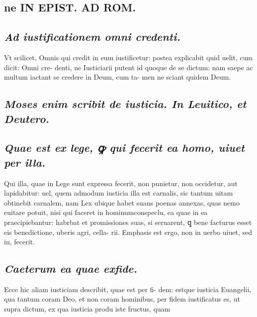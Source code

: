 \documentclass{article}
\begin{document}
\begin{pages}
\section*{ne IN EPIST. AD ROM.  }
\marginpar{[ p.]}
{}
\subsection*{\textit{Ad iustificationem omni credenti. }}\pstart Vt scilicet, Omnis qui credit in eum iustificetur: postea explicabit quid uelit, cum dicit: Omni cre- denti, ne Iusticiarii putent id quoque de se dictum: nam saepe ac multum iactant se credere in Deum, cum ta- men ne sciant quidem Deum.  \pend
{}
{}
\subsection*{\textit{Moses enim scribit de iusticia. In Leuitico, et Deutero. }}
{}
\subsection*{\textit{Quae est ex lege, ꝙ qui fecerit ea homo, uiuet per illa. }}\pstart Qui illa, quae in Lege sunt expressa fecerit, non punietur, non occidetur, aut lapidabitur: uel, quem admodum iusticia illa est carnalis, sic tantum uitam obtinebit carnalem, nam Lex ubique habet suans poenas annexas, quas nemo euitare potuit, nisi qui faceret in hominumconspeclu, ea quae in ea praecipiebantur: habrbat et promissiones suas, si seruarent, ꝗ bene facturus esset eis benedictione, uberis agri, cella- rii. Emphasis est ergo, non in uerbo uiuet, sed in, fecerit.   \pend
{}
{}
\subsection*{\textit{Caeterum ea quae exfide. }}\pstart Ecce hic aliam iusticiam describit, quae est per fi- dem: estque iusticia Euangelii, qua tantum coram Deo, et non coram hominibus, per fidem iustificatus es, ut supra dictum, ex qua iusticia produ iste fructus, quam  \pend

\end{pages}
\end{document}
